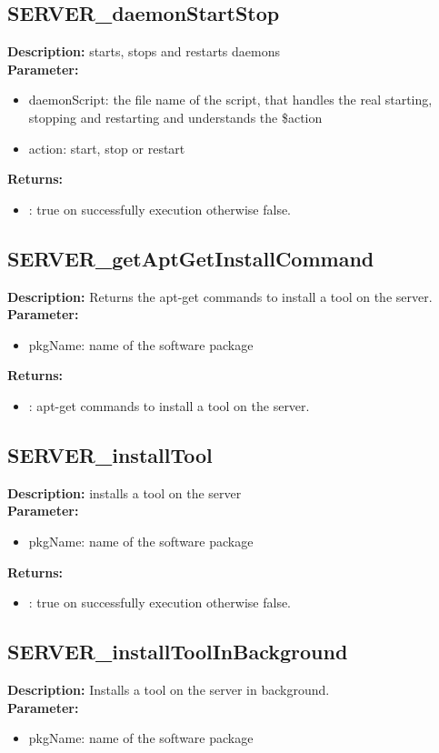 \subsection{SERVER\_daemonStartStop}
\textbf{Description:} starts, stops and restarts daemons\\
\textbf{Parameter:}
\begin{itemize}
\item daemonScript: the file name of the script, that handles the real starting, stopping and restarting and understands the \$action
\item action: start, stop or restart
\end{itemize}
\textbf{Returns:}
\begin{itemize}
\item : true on successfully execution otherwise false.
\end{itemize}

\subsection{SERVER\_getAptGetInstallCommand}
\textbf{Description:} Returns the apt-get commands to install a tool on the server.\\
\textbf{Parameter:}
\begin{itemize}
\item pkgName: name of the software package
\end{itemize}
\textbf{Returns:}
\begin{itemize}
\item : apt-get commands to install a tool on the server.
\end{itemize}

\subsection{SERVER\_installTool}
\textbf{Description:} installs a tool on the server\\
\textbf{Parameter:}
\begin{itemize}
\item pkgName: name of the software package
\end{itemize}
\textbf{Returns:}
\begin{itemize}
\item : true on successfully execution otherwise false.
\end{itemize}

\subsection{SERVER\_installToolInBackground}
\textbf{Description:} Installs a tool on the server in background.\\
\textbf{Parameter:}
\begin{itemize}
\item pkgName: name of the software package
\end{itemize}

